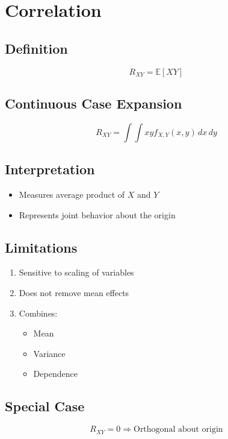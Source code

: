 \documentclass[12pt]{article}
\begin{document}
\section{Correlation}

\subsection{Definition}

\[
R_{XY} = \mathbb{E}[XY]
\]

\subsection{Continuous Case Expansion}

\[
R_{XY} = \int \int xy f_{X,Y}(x,y)\,dx\,dy
\]

\subsection{Interpretation}

\begin{itemize}
    \item Measures average product of $X$ and $Y$
    \item Represents joint behavior about the origin
\end{itemize}

\subsection{Limitations}

\begin{enumerate}
    \item Sensitive to scaling of variables
    \item Does not remove mean effects
    \item Combines:
    \begin{itemize}
        \item Mean
        \item Variance
        \item Dependence
    \end{itemize}
\end{enumerate}

\subsection{Special Case}

\[
R_{XY} = 0 \Rightarrow \text{Orthogonal about origin}
\]
\end{document}
